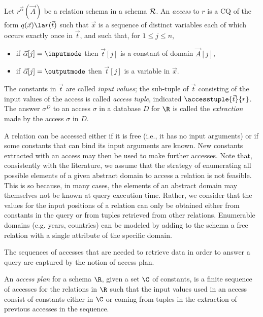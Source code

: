 \begin{definition}[Access]\label{def:access}
Let $r^{\vec\alpha}(\vec A)$ be a relation schema in a schema $\cal R$.
An \emph{access} to $r$ is a CQ of the form $q(\vec x)\la r(\vec t)$
such that $\vec x$ is a sequence of distinct variables each of which occurs exactly once in $\vec t$, and such that, for $1\leq j\leq n$,
\begin{itemize}
	\item if $\vec\alpha[j]=\inputmode$ then $\vec t[j]$ is a constant of domain $\vec A[j]$,
	\item if $\vec\alpha[j]=\outputmode$ then $\vec t[j]$ is a variable in $\vec x$.
\end{itemize}
The constants in $\vec t$ are called \emph{input values}; the sub-tuple of $\vec t$ consisting of the input values of the access is called \emph{access tuple}, indicated $\accesstuple{\vec t}{r}$.
The answer $\sigma^D$ to an access $\sigma$ in a database $D$ for $\R$ is called the \emph{extraction} made by the access $\sigma$ in $D$.
\end{definition}

A relation can be accessed either if it is free (i.e., it has no input arguments) or if some constants that can bind its input arguments are known. New constants extracted with an access may then be used to make further accesses.
Note that, consistently with the literature, we assume that the strategy of enumerating all possible elements of a given abstract domain to access a relation is not feasible. This is so because, in many cases, the elements of an abstract domain may themselves not be known at query execution time. 
Rather, we consider that the values for the input positions of a relation can only be obtained either from constants in the query or from tuples retrieved from other relations.
Enumerable domains (e.g. years, countries) can be modeled by adding to the schema a free relation with a single attribute of the specific domain.

The sequences of accesses that are needed to retrieve data in order to answer a query are captured by the notion of access plan.

\begin{definition}\label{def:access-plan}
An \emph{access plan} for a schema $\R$, given a set $\C$ of constants, is a finite sequence of accesses for the relations in $\R$ such that the input values used in an access consist of constants either in $\C$ or coming from tuples in the extraction of previous accesses in the sequence.
\end{definition}


